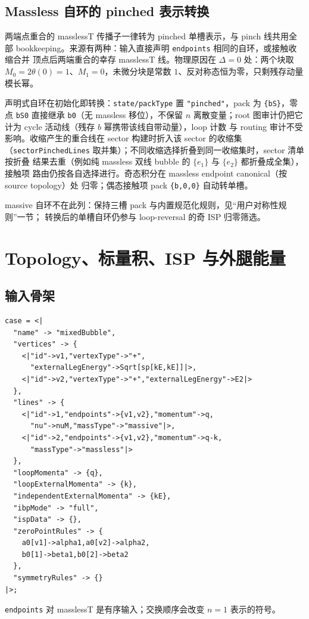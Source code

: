 ﻿\documentclass[a4paper,11pt]{article}
\begin{document}
\subsection{Massless 自环的 pinched 表示转换}
\label{manualMasslessTadpole}

两端点重合的 masslessT 传播子一律转为 pinched 单槽表示，与 pinch 线共用全部
bookkeeping。来源有两种：输入直接声明 \texttt{endpoints} 相同的自环，或接触收缩合并
顶点后两端重合的幸存 masslessT 线。物理原因在 $\Delta=0$ 处：两个块取
$M_0=2\theta(0)=1$、$M_1=0$，未微分块是常数 $1$、反对称态恒为零，只剩残存动量模长幂。

声明式自环在初始化即转换：\texttt{state/packType} 置 \texttt{"pinched"}，pack 为
\texttt{\{bS\}}，零点 \texttt{bS0} 直接继承 \texttt{b0}（无 massless 移位），不保留 $n$
离散变量；root 图审计仍把它计为 cycle 活动线（残存 $b$ 幂携带该线自带动量），loop 计数
与 routing 审计不受影响。收缩产生的重合线在 sector 构建时折入该 sector 的收缩集
（\texttt{sectorPinchedLines} 取并集）；不同收缩选择折叠到同一收缩集时，sector 清单按折叠
结果去重（例如纯 massless 双线 bubble 的 $\{e_1\}$ 与 $\{e_2\}$ 都折叠成全集），接触项
路由仍按各自选择进行。奇态积分在 massless endpoint canonical（按 source topology）处
归零；偶态接触项 pack \texttt{\{b,0,0\}} 自动转单槽。

massive 自环不在此列：保持三槽 pack 与内置规范化规则，见``用户对称性规则''一节；
转换后的单槽自环仍参与 loop-reversal 的奇 ISP 归零筛选。

\section{Topology、标量积、ISP 与外腿能量}

\subsection{输入骨架}

\begin{verbatim}
case = <|
  "name" -> "mixedBubble",
  "vertices" -> {
    <|"id"->v1,"vertexType"->"+",
      "externalLegEnergy"->Sqrt[sp[kE,kE]]|>,
    <|"id"->v2,"vertexType"->"+","externalLegEnergy"->E2|>
  },
  "lines" -> {
    <|"id"->1,"endpoints"->{v1,v2},"momentum"->q,
      "nu"->nuM,"massType"->"massive"|>,
    <|"id"->2,"endpoints"->{v1,v2},"momentum"->q-k,
      "massType"->"massless"|>
  },
  "loopMomenta" -> {q},
  "loopExternalMomenta" -> {k},
  "independentExternalMomenta" -> {kE},
  "ibpMode" -> "full",
  "ispData" -> {},
  "zeroPointRules" -> {
    a0[v1]->alpha1,a0[v2]->alpha2,
    b0[1]->beta1,b0[2]->beta2
  },
  "symmetryRules" -> {}
|>;
\end{verbatim}
\texttt{endpoints} 对 masslessT 是有序输入；交换顺序会改变 $n=1$ 表示的符号。
\end{document}
